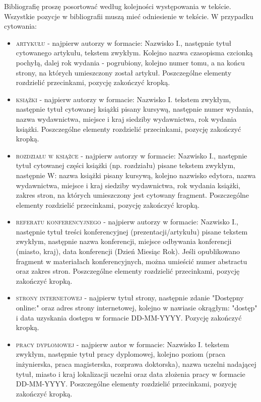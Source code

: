 Bibliografię proszę posortować według kolejności występowania w tekście. Wszystkie pozycje w bibliografii muszą mieć odniesienie w tekście. W przypadku cytowania:
\begin{itemize}
	\item \textsc{artykułu} - najpierw autorzy w formacie: Nazwisko I., następnie tytuł cytowanego artykułu, tekstem zwykłym. Kolejno nazwa czasopisma czcionką pochyłą, dalej rok wydania - pogrubiony, kolejno numer tomu, a na końcu strony, na których umieszczony został artykuł. Poszczególne elementy rozdzielić przecinkami, pozycję zakończyć kropką.
	\item \textsc{książki} - najpierw autorzy w formacie: Nazwisko I. tekstem zwykłym, następnie tytuł cytowanej książki pisany kursywą, następnie numer wydania, nazwa wydawnictwa, miejsce i kraj siedziby wydawnictwa, rok wydania książki. Poszczególne elementy rozdzielić przecinkami, pozycję zakończyć kropką.
	\item \textsc{rozdziału w książce} - najpierw autorzy w formacie: Nazwisko I., następnie tytuł cytowanej części książki (np. rozdziału) pisane tekstem zwykłym, następnie W: nazwa książki pisany kursywą, kolejno nazwisko edytora, nazwa wydawnictwa, miejsce i kraj siedziby wydawnictwa, rok wydania książki, zakres stron, na których umieszczony jest cytowany fragment. Poszczególne elementy rozdzielić przecinkami, pozycję zakończyć kropką.
	\item \textsc{referatu konferencyjnego} - najpierw autorzy w formacie: Nazwisko I., następnie tytuł treści konferencyjnej (prezentacji/artykułu) pisane tekstem zwykłym, następnie nazwa konferencji, miejsce odbywania konferencji (miasto, kraj), data konferencji (Dzień Miesiąc Rok). Jeśli opublikowano fragment w materiałach konferencyjnych, można umieścić numer abstractu oraz zakres stron. Poszczególne elementy rozdzielić przecinkami, pozycję zakończyć kropką.
	\item \textsc{strony internetowej} - najpierw tytuł strony, następnie zdanie "Dostępny online:" oraz adres strony internetowej, kolejno w nawiasie okrągłym: "dostęp" i data uzyskania dostępu w formacie DD-MM-YYYY. Pozycję zakończyć kropką.
	\item \textsc{pracy dyplomowej} - najpierw autor w formacie: Nazwisko I. tekstem zwykłym, następnie tytuł pracy dyplomowej, kolejno poziom (praca inżynierska, praca magisterska, rozprawa doktorska), nazwa uczelni nadającej tytuł, miasto i kraj lokalizacji uczelni oraz data złożenia pracy w formacie DD-MM-YYYY. Poszczególne elementy rozdzielić przecinkami, pozycję zakończyć kropką.
\end{itemize}